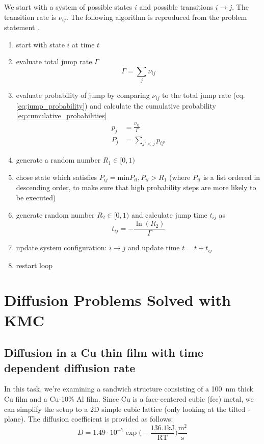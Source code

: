 We start with a system of possible states \(i\) and possible transitions \(i \rightarrow j\). The transition rate is \(\nu_{ij}\). The following algorithm is reproduced from the problem statement \cite{zaiserb}.

\begin{enumerate}
	\item start with state \(i\) at time \(t\)
	\item evaluate total jump rate $\Gamma$ \begin{equation}
		\Gamma = \sum\limits_{j}\nu_{ij} \label{eq:total_jump_rate}
	\end{equation} 
	\item evaluate probability of jump by comparing \( \nu_{ij} \) to the total jump rate (eq. \ref{eq:jump_probability}) and calculate the cumulative probability \ref{eq:cumulative_probabilities} 
	\begin{subequations}
		\begin{align}
			p_{j} & = \frac{\nu_{ij}}{\Gamma} \label{eq:jump_probability} \\
			 P_{j }&= \sum\limits_{j'<j}p_{ij'} \label{eq:cumulative_probabilities}
		\end{align}
	\end{subequations} 
	\item generate a random number \(R_{1} \in [0,1)\)
	\item chose state which satisfies \( P_{ij} = \mathrm{min}{P_{il}, P_{il} > R_{1}}\) (where \(P_{il}\) is a list ordered in descending order, to make sure that high probability steps are more likely to be executed)
	\item generate random number \(R_{2} \in [0,1)\) and calculate jump time \(t_{ij}\) as
	\begin{equation}
		t_{ij} = - \frac{\ln(R_{2})}{\Gamma}
	\end{equation}
	\item update system configuration: \(i \rightarrow j\) and update time \(t = t + t_{ij}\)
	\item restart loop

\end{enumerate} 

\section{Diffusion Problems Solved with KMC}
\subsection{Diffusion in a Cu thin film with time dependent diffusion rate}\label{sec:task1}
In this task, we're examining a sandwich structure consisting of a 100~nm thick Cu film and a Cu-10\% Al film. Since Cu is a face-centered cubic (fcc) metal, we can simplify the setup to a 2D simple cubic lattice (only looking at the tilted -plane). The diffusion coefficient is provided as follows:
\begin{equation}
	D = 1.49 \cdot 10^{-7} \exp \bigl( - \frac{136.1 \mathrm{kJ}}{\mathrm{R T}}   \bigr) \frac{\mathrm{m}^{2}}{\mathrm{s}}
\end{equation}

